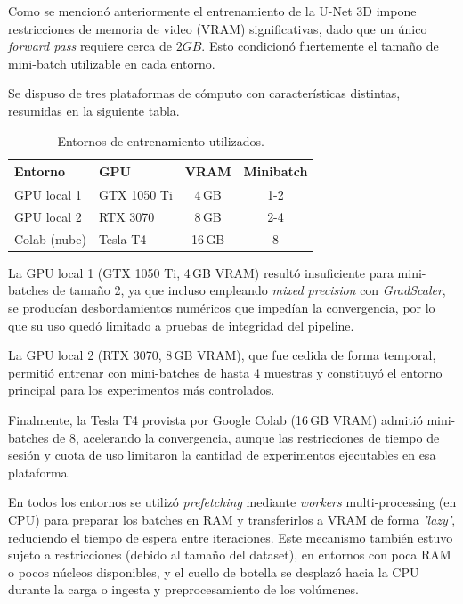 Como se mencionó anteriormente el entrenamiento de la U-Net 3D impone restricciones de memoria de video (VRAM) significativas, dado que un único \textit{forward pass} requiere cerca de $2GB$. Esto condicionó fuertemente el tamaño de mini-batch utilizable en cada entorno. 

Se dispuso de tres plataformas de cómputo con características distintas, resumidas en la siguiente tabla.

\begin{table}[H]
\centering
\label{tab:gpus}
\small
\setlength{\tabcolsep}{2pt} %
\begin{tabular}{|l|l|c|c|}
\hline
\textbf{Entorno} & \textbf{GPU} & \textbf{VRAM} & \textbf{Minibatch} \\
\hline
GPU local 1  & GTX 1050 Ti  & 4\,GB  & 1-2 \\
GPU local 2  & RTX 3070     & 8\,GB  & 2-4 \\
Colab (nube) & Tesla T4     & 16\,GB & 8 \\
\hline
\end{tabular}
\caption{Entornos de entrenamiento utilizados.}
\end{table}

La GPU local 1 (GTX 1050 Ti, 4\,GB VRAM) resultó insuficiente para mini-batches de tamaño 2, ya que incluso empleando \textit{mixed precision} con \textit{GradScaler}, se producían desbordamientos numéricos que impedían la convergencia, por lo que su uso quedó limitado a pruebas de integridad del pipeline.

La GPU local 2 (RTX 3070, 8\,GB VRAM), que fue cedida de forma temporal, permitió entrenar con mini-batches de hasta 4 muestras y constituyó el entorno principal para los experimentos más controlados. 

Finalmente, la Tesla T4 provista por Google Colab (16\,GB VRAM) admitió mini-batches de 8, acelerando la convergencia, aunque las restricciones de tiempo de sesión y cuota de uso limitaron la cantidad de experimentos ejecutables en esa plataforma.

\vspace{0.25cm}

En todos los entornos se utilizó \textit{prefetching} mediante \textit{workers} multi-processing (en CPU) para preparar los batches en RAM y transferirlos a VRAM de forma \textit{'lazy'}, reduciendo el tiempo de espera entre iteraciones. Este mecanismo también estuvo sujeto a restricciones (debido al tamaño del dataset), en entornos con poca RAM o pocos núcleos disponibles, y el cuello de botella se desplazó hacia la CPU durante la carga o ingesta y preprocesamiento de los volúmenes.

